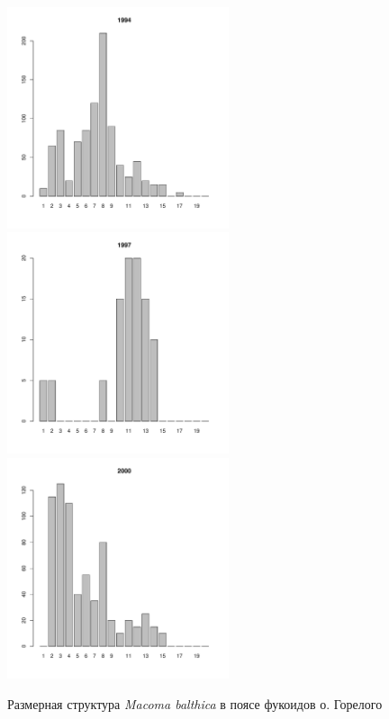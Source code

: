 \documentclass[12pt, a4paper]{article}
\begin{document}
\begin{figure}[h]
\begin{multicols}{3}
\hfill
\includegraphics[width=65mm]{../White_Sea/Luvenga_Goreliy/midlow_1994_.pdf}
\hfill
\includegraphics[width=65mm]{../White_Sea/Luvenga_Goreliy/midlow_1997_.pdf}
\hfill
\includegraphics[width=65mm]{../White_Sea/Luvenga_Goreliy/midlow_2000_.pdf}
\end{multicols}



\caption{Размерная структура {\it Macoma balthica} в поясе фукоидов о. Горелого}
\label{ris:size_str_Goreliy_midlow}
\end{figure}
\end{document}

